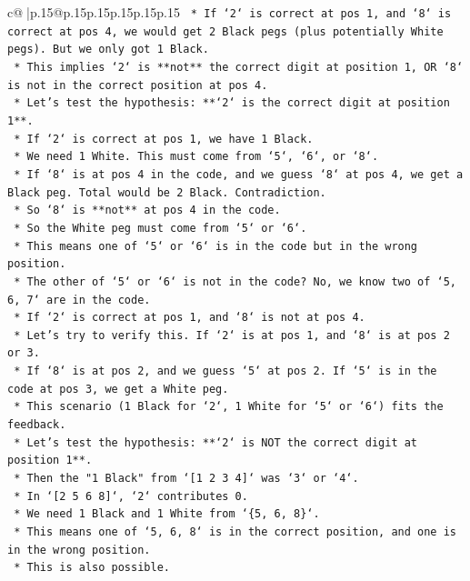 \documentclass{article}
\begin{document}
{\begin{supertabular}{c@{$\;$}|p{.15\linewidth}@{}p{.15\linewidth}p{.15\linewidth}p{.15\linewidth}p{.15\linewidth}p{.15\linewidth}}
{{{\texttt{        *   If `2` is correct at pos 1, and `8` is correct at pos 4, we would get 2 Black pegs (plus potentially White pegs). But we only got 1 Black.} \\
\texttt{        *   This implies `2` is **not** the correct digit at position 1, OR `8` is not in the correct position at pos 4.} \\
\texttt{    *   Let's test the hypothesis: **`2` is the correct digit at position 1**.} \\
\texttt{        *   If `2` is correct at pos 1, we have 1 Black.} \\
\texttt{        *   We need 1 White. This must come from `5`, `6`, or `8`.} \\
\texttt{        *   If `8` is at pos 4 in the code, and we guess `8` at pos 4, we get a Black peg. Total would be 2 Black. Contradiction.} \\
\texttt{        *   So `8` is **not** at pos 4 in the code.} \\
\texttt{        *   So the White peg must come from `5` or `6`.} \\
\texttt{        *   This means one of `5` or `6` is in the code but in the wrong position.} \\
\texttt{        *   The other of `5` or `6` is not in the code? No, we know two of `5, 6, 7` are in the code.} \\
\texttt{        *   If `2` is correct at pos 1, and `8` is not at pos 4.} \\
\texttt{        *   Let's try to verify this. If `2` is at pos 1, and `8` is at pos 2 or 3.} \\
\texttt{        *   If `8` is at pos 2, and we guess `5` at pos 2. If `5` is in the code at pos 3, we get a White peg.} \\
\texttt{        *   This scenario (1 Black for `2`, 1 White for `5` or `6`) fits the feedback.} \\
\texttt{    *   Let's test the hypothesis: **`2` is NOT the correct digit at position 1**.} \\
\texttt{        *   Then the "1 Black" from `{[}1 2 3 4{]}` was `3` or `4`.} \\
\texttt{        *   In `{[}2 5 6 8{]}`, `2` contributes 0.} \\
\texttt{        *   We need 1 Black and 1 White from `\{5, 6, 8\}`.} \\
\texttt{        *   This means one of `5, 6, 8` is in the correct position, and one is in the wrong position.} \\
\texttt{        *   This is also possible.} \\
}}}
\end{supertabular}}
\end{document}
